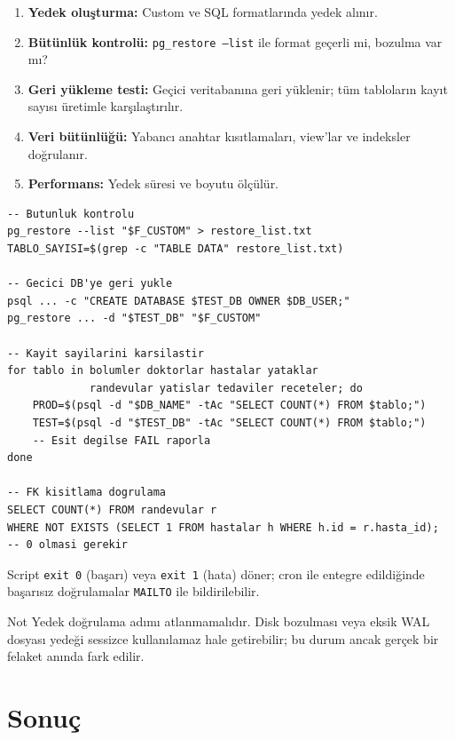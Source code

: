 \documentclass[12pt, a4paper]{report}
\begin{document}
\begin{enumerate}
  \item \textbf{Yedek oluşturma:} Custom ve SQL formatlarında yedek alınır.
  \item \textbf{Bütünlük kontrolü:} \texttt{pg\_restore --list} ile format geçerli mi, bozulma var mı?
  \item \textbf{Geri yükleme testi:} Geçici veritabanına geri yüklenir; tüm tabloların kayıt sayısı üretimle karşılaştırılır.
  \item \textbf{Veri bütünlüğü:} Yabancı anahtar kısıtlamaları, view'lar ve indeksler doğrulanır.
  \item \textbf{Performans:} Yedek süresi ve boyutu ölçülür.
\end{enumerate}

\begin{lstlisting}[caption={10\_yedek\_test.sh — bütünlük ve geri yükleme testi}]
-- Butunluk kontrolu
pg_restore --list "$F_CUSTOM" > restore_list.txt
TABLO_SAYISI=$(grep -c "TABLE DATA" restore_list.txt)

-- Gecici DB'ye geri yukle
psql ... -c "CREATE DATABASE $TEST_DB OWNER $DB_USER;"
pg_restore ... -d "$TEST_DB" "$F_CUSTOM"

-- Kayit sayilarini karsilastir
for tablo in bolumler doktorlar hastalar yataklar
             randevular yatislar tedaviler receteler; do
    PROD=$(psql -d "$DB_NAME" -tAc "SELECT COUNT(*) FROM $tablo;")
    TEST=$(psql -d "$TEST_DB" -tAc "SELECT COUNT(*) FROM $tablo;")
    -- Esit degilse FAIL raporla
done

-- FK kisitlama dogrulama
SELECT COUNT(*) FROM randevular r
WHERE NOT EXISTS (SELECT 1 FROM hastalar h WHERE h.id = r.hasta_id);
-- 0 olmasi gerekir
\end{lstlisting}

Script \texttt{exit 0} (başarı) veya \texttt{exit 1} (hata) döner; cron ile entegre edildiğinde başarısız doğrulamalar \texttt{MAILTO} ile bildirilebilir.

\begin{block}{Not}
  Yedek doğrulama adımı atlanmamalıdır. Disk bozulması veya eksik WAL dosyası yedeği sessizce kullanılamaz hale getirebilir; bu durum ancak gerçek bir felaket anında fark edilir.
\end{block}

\chapter{Sonuç}
\end{document}
